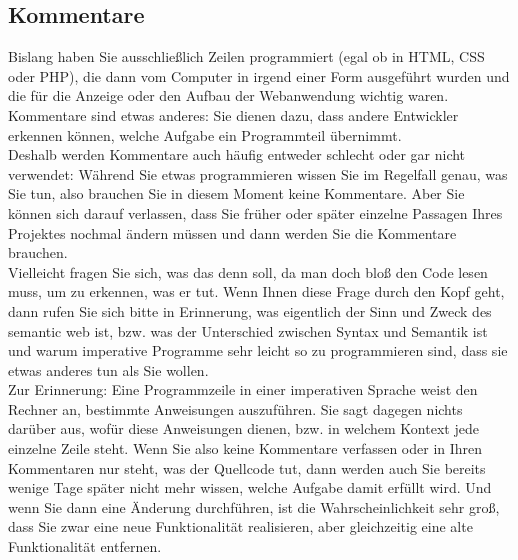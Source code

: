 \subsection{Kommentare}

Bislang haben Sie ausschließlich Zeilen programmiert (egal ob in HTML, CSS oder PHP), die dann vom Computer in irgend einer Form ausgeführt wurden und die für die Anzeige oder den Aufbau der Webanwendung wichtig waren. Kommentare sind etwas anderes: Sie dienen dazu, dass andere Entwickler erkennen können, welche Aufgabe ein Programmteil übernimmt.\\

Deshalb werden Kommentare auch häufig entweder schlecht oder gar nicht verwendet: Während Sie etwas programmieren wissen Sie im Regelfall genau, was Sie tun, also brauchen Sie in diesem Moment keine Kommentare. Aber Sie können sich darauf verlassen, dass Sie früher oder später einzelne Passagen Ihres Projektes nochmal ändern müssen und dann werden Sie die Kommentare brauchen.\\

Vielleicht fragen Sie sich, was das denn soll, da man doch bloß den Code lesen muss, um zu erkennen, was er tut. Wenn Ihnen diese Frage durch den Kopf geht, dann rufen Sie sich bitte in Erinnerung, was eigentlich der Sinn und Zweck des semantic web ist, bzw. was der Unterschied zwischen Syntax und Semantik ist und warum imperative Programme sehr leicht so zu programmieren sind, dass sie etwas anderes tun als Sie wollen.\\

Zur Erinnerung: Eine Programmzeile in einer imperativen Sprache weist den Rechner an, bestimmte Anweisungen auszuführen. Sie sagt dagegen nichts darüber aus, wofür diese Anweisungen dienen, bzw. in welchem Kontext jede einzelne Zeile steht. Wenn Sie also keine Kommentare verfassen oder in Ihren Kommentaren nur steht, was der Quellcode tut, dann werden auch Sie bereits wenige Tage später nicht mehr wissen, welche Aufgabe damit erfüllt wird. Und wenn Sie dann eine Änderung durchführen, ist die Wahrscheinlichkeit sehr groß, dass Sie zwar eine neue Funktionalität realisieren, aber gleichzeitig eine alte Funktionalität entfernen.\\

